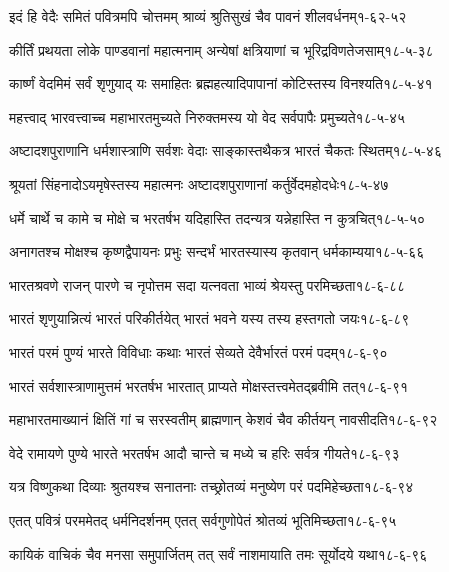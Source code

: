 \annotwolineshloka
{इदं हि वेदैः समितं पवित्रमपि चोत्तमम्}
{श्राव्यं श्रुतिसुखं चैव पावनं शीलवर्धनम्}{१-६२-५२}


\annotwolineshloka
{कीर्तिं प्रथयता लोके पाण्डवानां महात्मनाम्}
{अन्येषां क्षत्रियाणां च भूरिद्रविणतेजसाम्}{१८-५-३८}

\annotwolineshloka
{कार्ष्णं वेदमिमं सर्वं शृणुयाद् यः समाहितः}
{ब्रह्महत्यादिपापानां कोटिस्तस्य विनश्यति}{१८-५-४१}

\annotwolineshloka
{महत्त्वाद् भारवत्त्वाच्च महाभारतमुच्यते}
{निरुक्तमस्य यो वेद सर्वपापैः प्रमुच्यते}{१८-५-४५}

\annotwolineshloka
{अष्टादशपुराणानि धर्मशास्त्राणि सर्वशः}
{वेदाः साङ्कास्तथैकत्र भारतं चैकतः स्थितम्}{१८-५-४६}

\annotwolineshloka
{श्रूयतां सिंहनादोऽयमृषेस्तस्य महात्मनः}
{अष्टादशपुराणानां कर्तुर्वेदमहोदधेः}{१८-५-४७}

\annotwolineshloka
{धर्मे चार्थे च कामे च मोक्षे च भरतर्षभ}
{यदिहास्ति तदन्यत्र यन्नेहास्ति न कुत्रचित्}{१८-५-५०}

\annotwolineshloka
{अनागतश्च मोक्षश्च कृष्णद्वैपायनः प्रभुः}
{सन्दर्भं भारतस्यास्य कृतवान् धर्मकाम्यया}{१८-५-६६}

\annotwolineshloka
{भारतश्रवणे राजन् पारणे च नृपोत्तम}
{सदा यत्नवता भाव्यं श्रेयस्तु परमिच्छता}{१८-६-८८}

\annotwolineshloka
{भारतं शृणुयान्नित्यं भारतं परिकीर्तयेत्}
{भारतं भवने यस्य तस्य हस्तगतो जयः}{१८-६-८९}

\annotwolineshloka
{भारतं परमं पुण्यं भारते विविधाः कथाः}
{भारतं सेव्यते देवैर्भारतं परमं पदम्}{१८-६-९०}

\annotwolineshloka
{भारतं सर्वशास्त्राणामुत्तमं भरतर्षभ}
{भारतात् प्राप्यते मोक्षस्तत्त्वमेतद्ब्रवीमि तत्}{१८-६-९१}

\annotwolineshloka
{महाभारतमाख्यानं क्षितिं गां च सरस्वतीम्}
{ब्राह्मणान् केशवं चैव कीर्तयन् नावसीदति}{१८-६-९२}

\annotwolineshloka
{वेदे रामायणे पुण्ये भारते भरतर्षभ}
{आदौ चान्ते च मध्ये च हरिः सर्वत्र गीयते}{१८-६-९३}

\annotwolineshloka
{यत्र विष्णुकथा दिव्याः श्रुतयश्च सनातनाः}
{तच्छ्रोतव्यं मनुष्येण परं पदमिहेच्छता}{१८-६-९४}

\annotwolineshloka
{एतत् पवित्रं परममेतद् धर्मनिदर्शनम्}
{एतत् सर्वगुणोपेतं श्रोतव्यं भूतिमिच्छता}{१८-६-९५}

\annotwolineshloka
{कायिकं वाचिकं चैव मनसा समुपार्जितम्}
{तत् सर्वं नाशमायाति तमः सूर्योदये यथा}{१८-६-९६}

